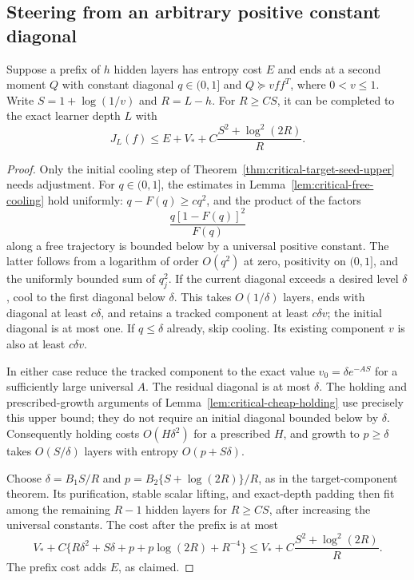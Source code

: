 \subsection{Steering from an arbitrary positive constant diagonal}

\begin{lemma}
\label{lem:steering-after-prefix}
Suppose a prefix of $h$ hidden layers has entropy cost $E$ and ends at
a second moment $Q$ with constant diagonal $q\in(0,1]$ and
$Q\succeq vff^T$, where $0<v\le1$. Write
$S=1+\log(1/v)$ and $R=L-h$.
For $R\ge CS$, it can be completed to the exact learner depth $L$ with
\[
 J_L(f)\le E+V_*+C\frac{S^2+\log^2(2R)}R.
\]
\end{lemma}

\begin{proof}
Only the initial cooling step of
Theorem~\ref{thm:critical-target-seed-upper} needs adjustment.
For $q\in(0,1]$, the estimates in
Lemma~\ref{lem:critical-free-cooling} hold uniformly:
$q-F(q)\ge cq^2$, and the product of the factors
\[
 \frac{q[1-F(q)]^2}{F(q)}
\]
along a free trajectory is bounded below by a universal positive
constant. The latter follows from a logarithm of order $O(q^2)$ at
zero, positivity on $(0,1]$, and the uniformly bounded sum of $q_j^2$.
If the current diagonal exceeds a desired level $\delta$, cool to the
first diagonal below $\delta$. This takes $O(1/\delta)$ layers,
ends with diagonal at least $c\delta$, and retains a tracked component
at least $c\delta v$; the initial diagonal is at most one.
If $q\le\delta$ already, skip cooling. Its existing component $v$
is also at least $c\delta v$.

In either case reduce the tracked component to the exact value
$v_0=\delta e^{-AS}$ for a sufficiently large universal $A$.
The residual diagonal is at most $\delta$.
The holding and prescribed-growth arguments of
Lemma~\ref{lem:critical-cheap-holding} use precisely this upper bound;
they do not require an initial diagonal bounded below by $\delta$.
Consequently holding costs $O(H\delta^2)$ for a prescribed $H$,
and growth to $p\ge\delta$ takes $O(S/\delta)$ layers with entropy
$O(p+S\delta)$.

Choose $\delta=B_1S/R$ and
$p=B_2\{S+\log(2R)\}/R$, as in the target-component theorem.
Its purification, stable scalar lifting, and exact-depth padding
then fit among the remaining $R-1$ hidden layers for $R\ge CS$,
after increasing the universal constants.
The cost after the prefix is at most
\[
 V_*+C\{R\delta^2+S\delta+p+p\log(2R)+R^{-4}\}
 \le V_*+C\frac{S^2+\log^2(2R)}R.
\]
The prefix cost adds $E$, as claimed.
\end{proof}


